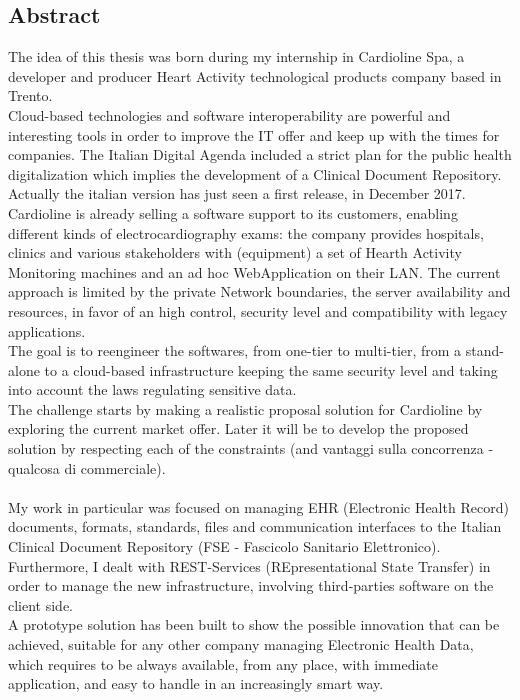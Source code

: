 \thispagestyle{empty}
\begin{center}
    {\chapter*{Abstract}} %
\end{center}
\label{abstract}

The idea of this thesis was born during my internship in Cardioline Spa, a developer and producer Heart Activity technological products company based in Trento.\\Cloud-based technologies and software interoperability are powerful and interesting tools in order to improve the IT offer and keep up with the times for companies. The Italian Digital Agenda included a strict plan for the public health digitalization which implies the development of a Clinical Document Repository. Actually the italian version has just seen a first release, in December 2017.\\Cardioline is already selling a software support to its customers, enabling different kinds of electrocardiography exams: the company provides hospitals, clinics and various stakeholders with (equipment) a set of Hearth Activity Monitoring machines and an ad hoc WebApplication on their LAN. The current approach is limited by the private Network boundaries, the server availability and resources, in favor of an high control, security level and compatibility with legacy applications.\\The goal is to reengineer the softwares, from one-tier to multi-tier, from a stand-alone to a cloud-based infrastructure keeping the same security level and taking into account the laws regulating sensitive data.\\ The challenge starts by making a realistic proposal solution for Cardioline by exploring the current market offer. Later it will be to develop the proposed solution by respecting each of the constraints (and vantaggi sulla concorrenza - qualcosa di commerciale).\\ \\My work in particular was focused on managing EHR (Electronic Health Record) documents, formats, standards, files and communication interfaces to the Italian Clinical Document Repository (FSE - Fascicolo Sanitario Elettronico). Furthermore, I dealt with REST-Services (REpresentational State Transfer) in order to manage the new infrastructure, involving third-parties software on the client side.\\A prototype solution has been built to show the possible innovation that can be achieved, suitable for any other company managing Electronic Health Data, which requires to be always available, from any place, with immediate application, and easy to handle in an increasingly smart way.\\ \\
